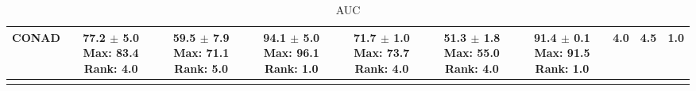 \begin{longtable}{|l|c|c|c|c|c|c|c|c|c|}
CONAD & \makecell{ 77.2 $\pm$ 5.0 \\ \scriptsize Max: 83.4 \\ \scriptsize Rank: 4.0 } & \makecell{ 59.5 $\pm$ 7.9 \\ \scriptsize Max: 71.1 \\ \scriptsize Rank: 5.0 } & \makecell{ 94.1 $\pm$ 5.0 \\ \scriptsize Max: 96.1 \\ \scriptsize Rank: 1.0 } & \makecell{ 71.7 $\pm$ 1.0 \\ \scriptsize Max: 73.7 \\ \scriptsize Rank: 4.0 } & \makecell{ 51.3 $\pm$ 1.8 \\ \scriptsize Max: 55.0 \\ \scriptsize Rank: 4.0 } & \makecell{ 91.4 $\pm$ 0.1 \\ \scriptsize Max: 91.5 \\ \scriptsize Rank: 1.0 } & 4.0 & 4.5 & 1.0 \\ \hline 
\caption{ AUC } \label{tab:synth_auc}
\end{longtable}
